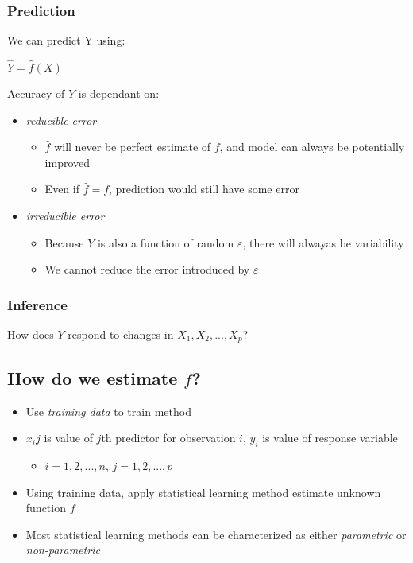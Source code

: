 \documentclass[]{book}
\providecommand{\tightlist}{%
  \setlength{\itemsep}{0pt}\setlength{\parskip}{0pt}}
\theoremstyle{definition}
\theoremstyle{definition}
\theoremstyle{definition}
\theoremstyle{remark}
\begin{document}
\subsubsection{Prediction}\label{prediction}

We can predict Y using:

\(\hat{Y} = \hat{f}(X)\)

Accuracy of \(Y\) is dependant on:

\begin{itemize}
\tightlist
\item
  \emph{reducible error}

  \begin{itemize}
  \tightlist
  \item
    \(\hat{f}\) will never be perfect estimate of \(f\), and model can
    always be potentially improved
  \item
    Even if \(\hat{f} = f\), prediction would still have some error
  \end{itemize}
\item
  \emph{irreducible error}

  \begin{itemize}
  \tightlist
  \item
    Because \(Y\) is also a function of random \(ε\), there will alwayas
    be variability
  \item
    We cannot reduce the error introduced by \(ε\)
  \end{itemize}
\end{itemize}

\subsubsection{Inference}\label{inference}

How does \(Y\) respond to changes in \(X_1, X_2, ..., X_p\)?

\subsection{\texorpdfstring{How do we estimate
\emph{\(f\)}?}{How do we estimate f?}}\label{how-do-we-estimate-f}

\begin{itemize}
\tightlist
\item
  Use \emph{training data} to train method
\item
  \(x_ij\) is value of \(j\)th predictor for observation \(i\), \(y_i\)
  is value of response variable

  \begin{itemize}
  \tightlist
  \item
    \(i = 1, 2, ..., n\), \(j = 1, 2, ..., p\)
  \end{itemize}
\item
  Using training data, apply statistical learning method estimate
  unknown function \(f\)
\item
  Most statistical learning methods can be characterized as either
  \emph{parametric} or \emph{non-parametric}
\end{itemize}
\end{document}
